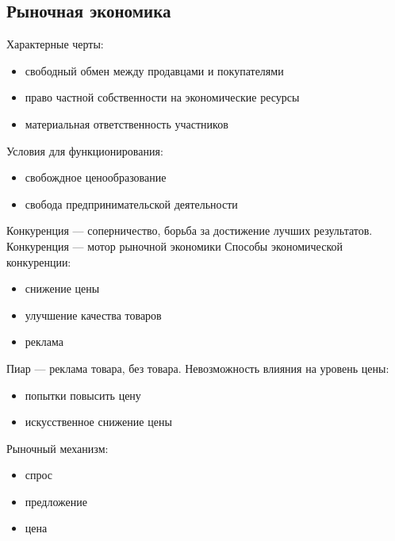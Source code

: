 \documentclass[a4paper, 12pt]{article}
\begin{document}
\subsection{Рыночная экономика}
 Характерные черты: 
 \begin{itemize}
     \item свободный обмен между продавцами и покупателями
     \item право частной собственности на экономические ресурсы
     \item материальная ответственность участников
 \end{itemize}
 Условия для функционирования:
 \begin{itemize}
     \item свобождное ценообразование
     \item свобода предпринимательской деятельности
 \end{itemize}
 Конкуренция --- соперничество, борьба за достижение лучших результатов.
 Конкуренция --- мотор рыночной экономики
 Способы экономической конкуренции:
 \begin{itemize}
     \item снижение цены
     \item улучшение качества товаров
     \item реклама 
 \end{itemize}
Пиар --- реклама товара, без товара.
Невозможность влияния на уровень цены:
\begin{itemize}
    \item попытки повысить цену
    \item искусственное снижение цены
\end{itemize}
Рыночный механизм:
\begin{itemize}
    \item спрос
    \item предложение 
    \item цена
\end{itemize}
\end{document}
